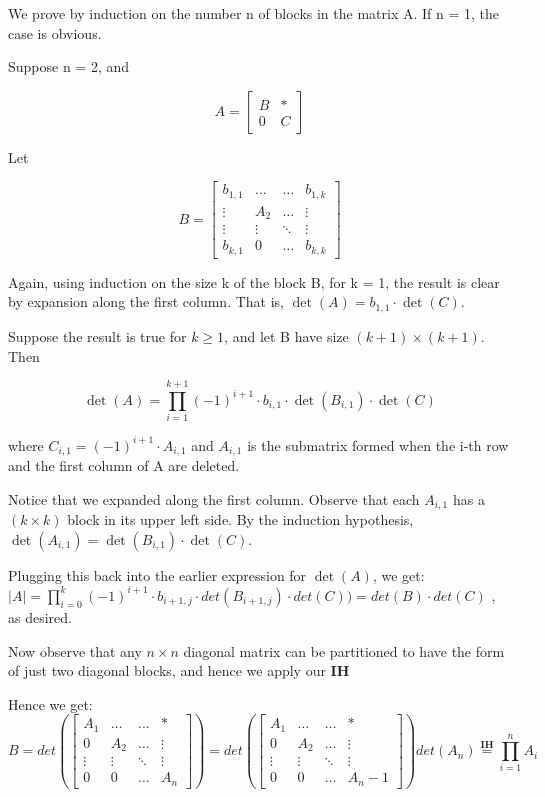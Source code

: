 \documentclass [12pt]{article}
\begin{document}
We prove by induction on the number n of blocks in the matrix A. If n =
1, the case is obvious. 

Suppose n = 2, and 

\[A=
\begin {bmatrix}
B&*\\
0&C%
\end {bmatrix}
 \]
 

Let 

\[B=
\begin {bmatrix}
b_{1,1}&\ldots &\ldots &b_{1,k}\\
\vdots &A_2&\ldots &\vdots \\
\vdots &\vdots &\ddots &\vdots \\
b_{k,1}&0&\ldots &b_{k,k}%
\end {bmatrix}
 \]
 

Again, using induction on the size k of the block B, for k = 1, the result
is clear by expansion along the first column. That is, \(\det (A)=b_{1,1}\cdot \det (C)\).

Suppose the result is true for \(k\geq 1\), and let B have size \((k+1)\times (k+1)\).
Then 

\[\det (A)=\prod _{i=1}^{k+1}(-1)^{i+1}\cdot b_{i,1}\cdot \det (B_{i,1})\cdot \det (C)
\]
 

where \(C_{i,1}=(-1)^{i+1}\cdot A_{i,1}\) and \(A_{i,1}\) is the submatrix
formed when the i-th row and the first column of A are deleted. 

Notice that we expanded along the first column. Observe that each \(A_{i,1}\)
has a \((k\times k)\) block in its upper left side. By the induction hypothesis,
\(\det (A_{i,1})=\det (B_{i,1})\cdot \det (C)\). 

Plugging this back into the earlier expression for \(\det (A)\), we get:
\(|A|=\prod _{i=0}^{k}(-1)^{i+1}\cdot b_{i+1,j}\cdot det(B_{i+1,j})\cdot det(C))=det(B)\cdot det(C)\)
, as desired. 

Now observe that any $n\times n$ diagonal matrix can be partitioned to have
the form of just two diagonal blocks, and hence we apply our \textbf{IH}

Hence we get: 
\[B=det(
\begin {bmatrix}
A_1&\ldots &\ldots &*\\
0&A_2&\ldots &\vdots \\
\vdots &\vdots &\ddots &\vdots \\
0&0&\ldots &A_n%
\end {bmatrix}
)=det(
\begin {bmatrix}
A_1&\ldots &\ldots &*\\
0&A_2&\ldots &\vdots \\
\vdots &\vdots &\ddots &\vdots \\
0&0&\ldots &A_n-1%
\end {bmatrix}
)det(A_n)\stackrel {\textbf{IH}}{=}\prod _{i=1}^{n}A_{i} \]
  
\end{document}

